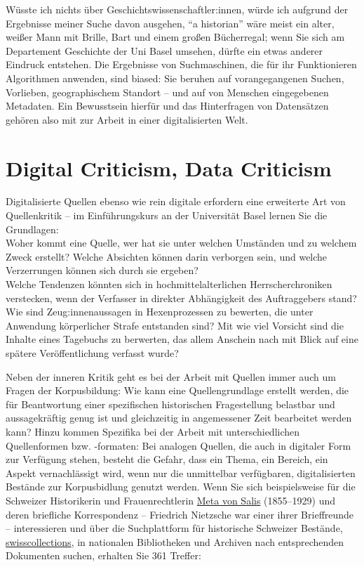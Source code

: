 \documentclass[
  letterpaper,
]{book}
\begin{document}
Wüsste ich nichts über Geschichtswissenschaftler:innen, würde ich
aufgrund der Ergebnisse meiner Suche davon ausgehen, ``a historian''
wäre meist ein alter, weißer Mann mit Brille, Bart und einem großen
Bücherregal; wenn Sie sich am Departement Geschichte der Uni Basel
umsehen, dürfte ein etwas anderer Eindruck entstehen. Die Ergebnisse von
Suchmaschinen, die für ihr Funktionieren Algorithmen anwenden, sind
biased: Sie beruhen auf vorangegangenen Suchen, Vorlieben,
geographischem Standort -- und auf von Menschen eingegebenen Metadaten.
Ein Bewusstsein hierfür und das Hinterfragen von Datensätzen gehören
also mit zur Arbeit in einer digitalisierten Welt.

\hypertarget{digital-criticism-data-criticism}{%
\section{Digital Criticism, Data
Criticism}\label{digital-criticism-data-criticism}}

Digitalisierte Quellen ebenso wie rein digitale erfordern eine
erweiterte Art von Quellenkritik -- im Einführungskurs an der
Universität Basel lernen Sie die Grundlagen:\\
Woher kommt eine Quelle, wer hat sie unter welchen Umständen und zu
welchem Zweck erstellt? Welche Absichten können darin verborgen sein,
und welche Verzerrungen können sich durch sie ergeben?\\
Welche Tendenzen könnten sich in hochmittelalterlichen
Herrscherchroniken verstecken, wenn der Verfasser in direkter
Abhängigkeit des Auftraggebers stand? Wie sind Zeug:innenaussagen in
Hexenprozessen zu bewerten, die unter Anwendung körperlicher Strafe
entstanden sind? Mit wie viel Vorsicht sind die Inhalte eines Tagebuchs
zu berwerten, das allem Anschein nach mit Blick auf eine spätere
Veröffentlichung verfasst wurde?

Neben der inneren Kritik geht es bei der Arbeit mit Quellen immer auch
um Fragen der Korpusbildung: Wie kann eine Quellengrundlage erstellt
werden, die für Beantwortung einer spezifischen historischen
Fragestellung belastbar und aussagekräftig genug ist und gleichzeitig in
angemessener Zeit bearbeitet werden kann? Hinzu kommen Spezifika bei der
Arbeit mit unterschiedlichen Quellenformen bzw. -formaten: Bei analogen
Quellen, die auch in digitaler Form zur Verfügung stehen, besteht die
Gefahr, dass ein Thema, ein Bereich, ein Aspekt vernachlässigt wird,
wenn nur die unmittelbar verfügbaren, digitalisierten Bestände zur
Korpusbidlung genutzt werden. Wenn Sie sich beispielsweise für die
Schweizer Historikerin und Frauenrechtlerin
\href{https://de.wikipedia.org/wiki/Meta_von_Salis}{Meta von Salis}
(1855--1929) und deren briefliche Korrespondenz -- Friedrich Nietzsche
war einer ihrer Brieffreunde -- interessieren und über die Suchplattform
für historische Schweizer Bestände,
\href{https://swisscollections.ch/Search/Advanced}{swisscollections}, in
nationalen Bibliotheken und Archiven nach entsprechenden Dokumenten
suchen, erhalten Sie 361 Treffer:
\end{document}
